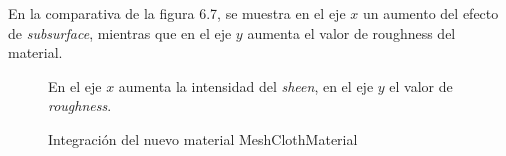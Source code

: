 En la comparativa de la figura 6.7, se muestra en el eje $x$ un aumento del efecto de \textit{subsurface}, mientras que en el
eje $y$ aumenta el valor de roughness del material.

\begin{figure}[H]
  \vspace{0.5cm}
  \centering
    \caption{En el eje $x$ aumenta la intensidad del \textit{sheen}, en el eje $y$ el valor de \textit{roughness}.}
  \vspace{0.5cm}
\end{figure}
\singlespacing

\begin{figure}[H]
  \vspace{0.5cm}
  \centering
  \caption{Integraci\'on del nuevo material MeshClothMaterial}
  \vspace{0.5cm}
\end{figure}
\singlespacing